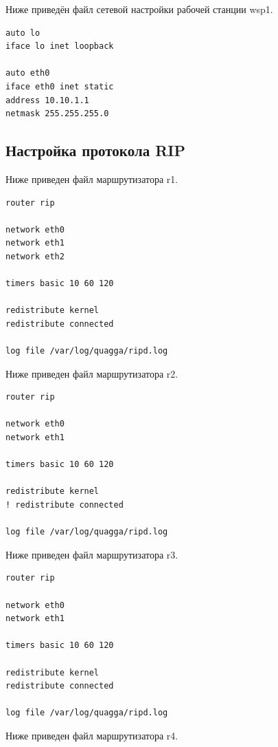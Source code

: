\documentclass[a4paper,12pt]{article}
\begin{document}
Ниже приведён файл сетевой настройки рабочей станции wsp1.

\begin{Verbatim}
auto lo
iface lo inet loopback

auto eth0
iface eth0 inet static
address 10.10.1.1
netmask 255.255.255.0

\end{Verbatim}


\subsection{Настройка протокола RIP}

Ниже приведен файл  маршрутизатора r1.

\begin{Verbatim}
router rip

network eth0
network eth1
network eth2

timers basic 10 60 120

redistribute kernel
redistribute connected

log file /var/log/quagga/ripd.log

\end{Verbatim}

Ниже приведен файл  маршрутизатора r2.

\begin{Verbatim}
router rip

network eth0
network eth1

timers basic 10 60 120

redistribute kernel
! redistribute connected

log file /var/log/quagga/ripd.log

\end{Verbatim}

Ниже приведен файл  маршрутизатора r3.

\begin{Verbatim}
router rip

network eth0
network eth1

timers basic 10 60 120

redistribute kernel
redistribute connected

log file /var/log/quagga/ripd.log

\end{Verbatim}

Ниже приведен файл  маршрутизатора r4.
\end{document}
